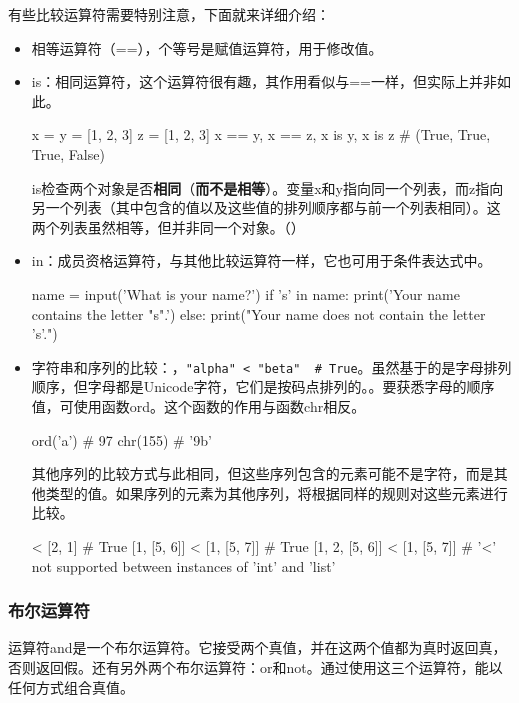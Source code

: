 有些比较运算符需要特别注意，下面就来详细介绍：
\begin{itemize}
    \item 相等运算符（==），个等号是赋值运算符，用于修改值。
    \item is：相同运算符，这个运算符很有趣，其作用看似与==一样，但实际上并非如此。
    \begin{pyc}
x = y = [1, 2, 3]
z = [1, 2, 3]
x == y, x == z, x is y, x is z  # (True, True, True, False)
    \end{pyc}
    is检查两个对象是否\textbf{相同}（\textbf{而不是相等}）。变量x和y指向同一个列表，而z指向另一个列表（其中包含的值以及这些值的排列顺序都与前一个列表相同）。这两个列表虽然相等，但并非同一个对象。（）

    \item in：成员资格运算符，与其他比较运算符一样，它也可用于条件表达式中。
    \begin{pyc}
name = input('What is your name?')
if 's' in name:
    print('Your name contains the letter "s".')
else:
    print("Your name does not contain the letter 's'.")
    \end{pyc}
    \item 字符串和序列的比较：，\verb|"alpha" < "beta"  # True|。虽然基于的是字母排列顺序，但字母都是Unicode字符，它们是按码点排列的。。要获悉字母的顺序值，可使用函数ord。这个函数的作用与函数chr相反。
    \begin{pyc}
ord('a')  # 97
chr(155)  # '\x9b'
    \end{pyc}
    其他序列的比较方式与此相同，但这些序列包含的元素可能不是字符，而是其他类型的值。如果序列的元素为其他序列，将根据同样的规则对这些元素进行比较。
    \begin{pyc}
[1, 2] < [2, 1]  # True
[1, [5, 6]] < [1, [5, 7]]  # True
[1, 2, [5, 6]] < [1, [5, 7]]
# '<' not supported between instances of 'int' and 'list'
    \end{pyc}
\end{itemize}
\subsubsection{布尔运算符}
运算符and是一个布尔运算符。它接受两个真值，并在这两个值都为真时返回真，否则返回假。还有另外两个布尔运算符：or和not。通过使用这三个运算符，能以任何方式组合真值。

